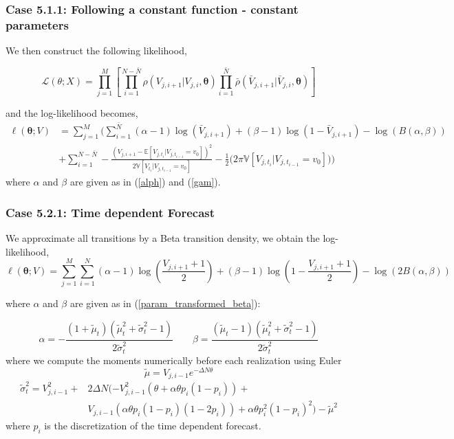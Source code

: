 \documentclass[aspectratio=169]{beamer}\usepackage[utf8]{inputenc}
\newcommand{\E}{\mathbb{E}}
\newcommand{\V}{\mathbb{V}}
\begin{document}
\begin{frame}\frametitle{ Case 5.1.1: Following a constant function - constant parameters }
We then construct the following likelihood,


\begin{equation}
\mathcal{L}(\theta;X) = \prod\limits_{j=1}^M \left[ \prod\limits_{i=1}^{N-\bar{N}}\rho( {V_{j,i+1}|V_{j,i}}, \bm{\theta}) \prod\limits_{i=1}^{\bar{N}} \bar{\rho}( {\bar{V}_{j,i+1}|\bar{V}_{j,i}}, \bm{\theta}) \right]
\end{equation}

and the log-likelihood becomes, 
\begin{equation}
\begin{split}
\ell(\bm{\theta}; V)&= \sum\limits_{j=1}^M \Big(  \sum\limits_{i=1}^{\bar{N}} (\alpha -1)\log(\bar{V}_{j,i+1}) + (\beta -1) \log(1-\bar{V}_{j,i+1}) - \log (B(\alpha, \beta))\\
&+ \sum\limits_{i=1}^{N-\bar{N}} - \frac{(V_{j,i+1}   - \E[V_{j,t_i}| V_{j,t_{i-1}}=v_0] )^2}{2\V[V_{t_i}| V_{j,t_{i-1}}=v_0]} - \frac{1}{2} \Big(2 \pi \V[V_{j,t_i}| V_{j,t_{i-1}}=v_0] \Big) \Big)
\end{split}
\end{equation}
where $\alpha$ and $\beta$ are given as in (\ref{alph}) and (\ref{gam}).

\end{frame}


\begin{frame}\frametitle{ Case 5.2.1: Time dependent Forecast  }
We approximate all transitions by a Beta transition density, we obtain the log-likelihood, 
\begin{equation}
\ell(\bm{\theta}; V)= \sum\limits_{j=1}^M \sum\limits_{i=1}^N (\alpha -1)\log(\frac{V_{j,i+1}+1}{2}) + (\beta -1) \log(1-\frac{V_{j,i+1}+1}{2}) - \log ( 2 B(\alpha, \beta))
\end{equation}

where $\alpha$ and $\beta$ are given as in (\ref{param_transformed_beta}):

\begin{equation}
\alpha = - \frac{(1+\tilde{\mu}_t )(\tilde{\mu}_t^2 + \tilde{\sigma}_t^2 -1)}{2 \tilde{\sigma}_t^2} \quad \quad \beta =  \frac{(\tilde{\mu}_t-1 )(\tilde{\mu}_t^2 + \tilde{\sigma}_t^2 -1)}{2 \tilde{\sigma}_t^2} \label{param_transformed_beta}
\end{equation}
where we compute the moments numerically before each realization using Euler
\begin{equation}
\tilde{\mu} = V_{j,i-1}e^{- \Delta N \theta}
\end{equation}
\begin{equation}
\begin{split}
\tilde{\sigma}_t^2 =  V_{j,i-1}^2 +& 2\Delta N (-V_{j,i-1}^2(\theta+\alpha\theta p_i (1-p_i) )  + \\
& V_{j,i-1}(\alpha\theta p_i(1-p_i)(1-2p_i )) + \alpha\theta p_i^2(1-p_i)^2) - \tilde{\mu}^2
\end{split}
\end{equation}
where $p_i$ is the discretization of the time dependent forecast.

\end{frame}
\end{document}
